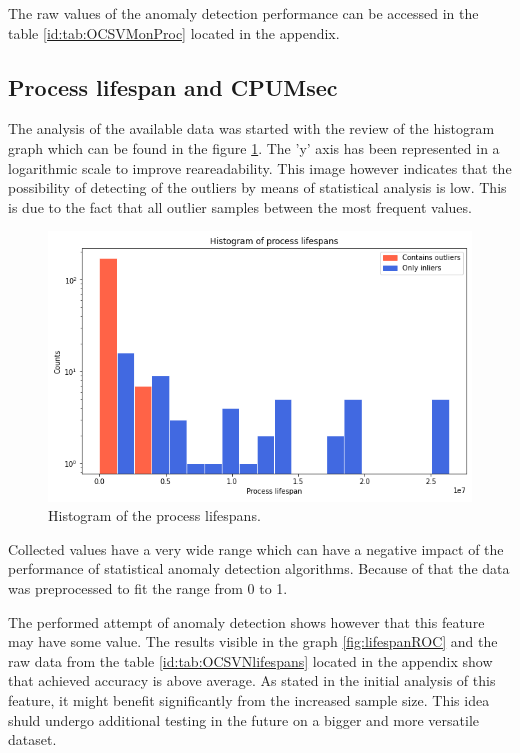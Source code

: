 \documentclass[a4paper,twoside,12pt]{book}
\begin{document}
The raw values of the anomaly detection performance can be accessed in the table \ref{id:tab:OCSVMonProc} located in the 
appendix. 

\subsection{Process lifespan and CPUMsec}
The analysis of the available data was started with the review of the histogram graph which can be found in the 
figure \ref{fig:lifespanHist}. The 'y' axis has been represented in a logarithmic scale to improve reareadability.
This image however indicates that the possibility of detecting of the outliers by means of statistical
analysis is low. This is due to the fact that all outlier samples between the most frequent values. 

\begin{figure}
	\centering
	\includegraphics[scale=0.9]{images/LifespanHist}
	\caption{Histogram of the process lifespans.}
	\label{fig:lifespanHist}
 \end{figure}


Collected values have a very wide range which can have a negative impact of the performance of statistical anomaly detection algorithms.
Because of that the data was preprocessed to fit the range from 0 to 1. 

The performed attempt of anomaly detection shows however that this feature may have some value. The results visible in the graph
\ref{fig:lifespanROC} and the raw data from the table \ref{id:tab:OCSVNlifespans} located in the appendix show that achieved accuracy 
is above average. As stated in the initial analysis of this feature, it might benefit significantly from the increased sample size.
This idea shuld undergo additional testing in the future on a bigger and more versatile dataset.
\end{document}

